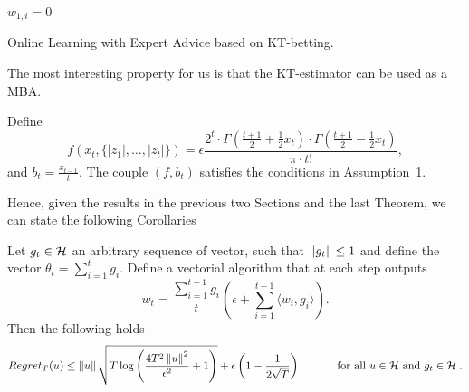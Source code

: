 \begin{algorithm}[t]
  \begin{algorithmic}
  {
     $w_{1,i}=0$
    \ENDFOR
  }
  \end{algorithmic}
  \caption{Online Learning with Expert Advice based on \ac{KT}-betting.}
  \label{algo:kt_expert}
\end{algorithm}

The most interesting property for us is that the \ac{KT}-estimator can be used as a \ac{MBA}.
\begin{theorem}
\label{theo:kt_is_mba}
Define 
\begin{equation}
\label{eq:kt_potential}
f\left( x_{t}, \{|z_1|, \ldots, |z_{t}|\}\right) 
= \epsilon  \frac{2^t \cdot \Gamma \left(\frac{t+1}{2} + \frac{1}{2} x_{t} \right) \cdot \Gamma \left(\frac{t+1}{2} - \frac{1}{2} x_{t} \right)}{\pi \cdot t!}, 
\end{equation}
and $b_t= \frac{x_{t-1}}{t}$.
The couple $(f,b_t)$ satisfies the conditions in Assumption~1.
\end{theorem}

Hence, given the results in the previous two Sections and the last Theorem, we can state the following Corollaries
\begin{cor}
  \label{cor:kt_hilbert}
  Let $g_t \in \mathcal{H}$ an arbitrary sequence of vector, such that $\left\|{g_t}\right\| \leq 1$ and define the vector $\theta_t=\sum_{i=1}^{t} g_i$.
  Define a vectorial algorithm that at each step outputs 
  \[
  w_t = \frac{\sum_{i=1}^{t-1} g_i}{t} \left(\epsilon+ \sum_{i=1}^{t-1} \langle w_i, g_i \rangle \right).
  \]
  Then the following holds
  \[
    Regret_T(u) \leq \left\|{u}\right\| \sqrt{T \log \left(\frac{4 T^2 \left\|{u}\right\|^2}{\epsilon^2} +1 \right)} +\epsilon\left(1-\frac{1}{2\sqrt{T}}\right) \quad \quad \quad \textnormal{ for all } u \in \mathcal{H} \textnormal{ and } g_t \in \mathcal{H} \; .
  \]
\end{cor}

